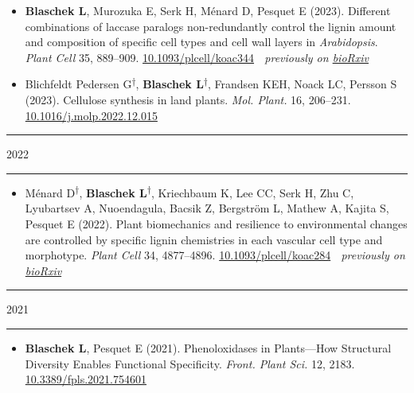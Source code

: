 \documentclass[11pt]{article}
\newcommand*{\xdash}[1][3em]{\rule[0.5ex]{#1}{0.55pt}}
\begin{document}
\vspace{-0.175cm}	
\begin{itemize}[label={},itemindent=-9pt,leftmargin=24pt]
	\itemsep-0.1cm
	\item \textbf{Blaschek L}, Murozuka E, Serk H, Ménard D, Pesquet E (2023). Different combinations of laccase paralogs non-redundantly control the lignin amount and composition of specific cell types and cell wall layers in \textit{Arabidopsis}. \textit{Plant Cell} 35, 889–909. \href{https://doi.org/10.1093/plcell/koac344}{10.1093/plcell/koac344} \textemdash $\;$ \textit{previously on \href{https://doi.org/10.1101/2022.05.04.490011}{bioRxiv}}
	\item Blichfeldt Pedersen G\textsuperscript{$\dagger$}, \textbf{Blaschek L}\textsuperscript{$\dagger$}, Frandsen KEH, Noack LC, Persson S (2023). Cellulose synthesis in land plants. \textit{Mol. Plant.} 16, 206–231. \href{https://doi.org/10.1016/j.molp.2022.12.015}{10.1016/j.molp.2022.12.015}
\end{itemize}


\hspace*{\fill} \xdash[6em] \large{\textsc{2022}} \xdash[6em] \hspace*{\fill} \normalsize

\vspace{-0.175cm}	
\begin{itemize}[label={},itemindent=-9pt,leftmargin=24pt]
	\itemsep-0.1cm
	\item Ménard D\textsuperscript{$\dagger$}, \textbf{Blaschek L}\textsuperscript{$\dagger$}, Kriechbaum K, Lee CC, Serk H, Zhu C, Lyubartsev A, Nuoendagula, Bacsik Z, Bergström L, Mathew A, Kajita S, Pesquet E (2022). Plant biomechanics and resilience to environmental changes are controlled by specific lignin chemistries in each vascular cell type and morphotype. \textit{Plant Cell} 34, 4877–4896. \href{https://doi.org/10.1093/plcell/koac284}{10.1093/plcell/koac284} \textemdash $\;$ \textit{previously on \href{https://doi.org/10.1101/2021.06.12.447240}{bioRxiv}}
\end{itemize}

\hspace*{\fill} \xdash[6em] \large{\textsc{2021}} \xdash[6em] \hspace*{\fill} \normalsize

\vspace{-0.175cm}	
\begin{itemize}[label={},itemindent=-9pt,leftmargin=24pt]
	\itemsep-0.1cm
	\item \textbf{Blaschek L}, Pesquet E (2021). Phenoloxidases in Plants—How Structural Diversity Enables Functional Specificity. \textit{Front. Plant Sci.} 12, 2183.
	\href{https://doi.org/10.3389/fpls.2021.754601}{10.3389/fpls.2021.754601}
\end{itemize}
\end{document}
